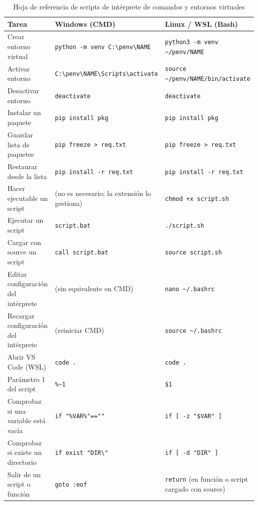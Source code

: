 \begin{table}[h]
\centering
\caption{Hoja de referencia de scripts de intérprete de comandos y entornos virtuales}
\label{tab:cheatsheet}
\begin{tabular}{@{}p{}p{}p{}@{}}
\toprule
\textbf{Tarea} & \textbf{Windows (CMD)} & \textbf{Linux / WSL (Bash)} \\
\midrule
Crear entorno virtual
  & \texttt{python -m venv C:\textbackslash penv\textbackslash NAME}
  & \texttt{python3 -m venv \textasciitilde/penv/NAME} \\[4pt]
Activar entorno
  & \texttt{C:\textbackslash penv\textbackslash NAME\textbackslash Scripts\textbackslash activate}
  & \texttt{source \textasciitilde/penv/NAME/bin/activate} \\[4pt]
Desactivar entorno
  & \texttt{deactivate}
  & \texttt{deactivate} \\[4pt]
Instalar un paquete
  & \texttt{pip install pkg}
  & \texttt{pip install pkg} \\[4pt]
Guardar lista de paquetes
  & \texttt{pip freeze > req.txt}
  & \texttt{pip freeze > req.txt} \\[4pt]
Restaurar desde la lista
  & \texttt{pip install -r req.txt}
  & \texttt{pip install -r req.txt} \\[4pt]
Hacer ejecutable un script
  & (no es necesario; la extensión lo gestiona)
  & \texttt{chmod +x script.sh} \\[4pt]
Ejecutar un script
  & \texttt{script.bat}
  & \texttt{./script.sh} \\[4pt]
Cargar con source un script
  & \texttt{call script.bat}
  & \texttt{source script.sh} \\[4pt]
Editar configuración del intérprete
  & (sin equivalente en CMD)
  & \texttt{nano \textasciitilde/.bashrc} \\[4pt]
Recargar configuración del intérprete
  & (reiniciar CMD)
  & \texttt{source \textasciitilde/.bashrc} \\[4pt]
Abrir VS Code (WSL)
  & \texttt{code .}
  & \texttt{code .} \\[4pt]
Parámetro 1 del script
  & \texttt{\%\textasciitilde1}
  & \texttt{\$1} \\[4pt]
Comprobar si una variable está vacía
  & \texttt{if "\%VAR\%"==""}
  & \texttt{if [ -z "\$VAR" ]} \\[4pt]
Comprobar si existe un directorio
  & \texttt{if exist "DIR\textbackslash"}
  & \texttt{if [ -d "DIR" ]} \\[4pt]
Salir de un script o función
  & \texttt{goto :eof}
  & \texttt{return} (en función o script cargado con source) \\
\bottomrule
\end{tabular}
\end{table}

